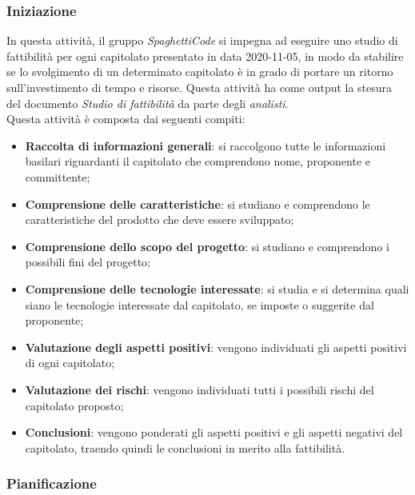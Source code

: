 \subsubsection{Iniziazione}
\label{par:iniziazione}
In questa attività, il gruppo \emph{SpaghettiCode} si impegna ad eseguire uno studio di fattibilità per ogni capitolato presentato in data
2020-11-05, in modo da stabilire se lo svolgimento di un determinato capitolato è in grado di portare un ritorno sull'investimento di tempo
e risorse. Questa attività ha come output la stesura del documento \emph{Studio di fattibilità} da parte degli \emph{analisti}.\\
Questa attività è composta dai seguenti compiti:
\begin{itemize}
    \item \textbf{Raccolta di informazioni generali}: si raccolgono tutte le informazioni basilari riguardanti il
    capitolato che comprendono nome, proponente e committente;
    \item \textbf{Comprensione delle caratteristiche}: si studiano e comprendono le caratteristiche del prodotto che
    deve essere sviluppato;
    \item \textbf{Comprensione dello scopo del progetto}: si studiano e comprendono i possibili fini del progetto;
    \item \textbf{Comprensione delle tecnologie interessate}: si studia e si determina quali siano le tecnologie
    interessate dal capitolato, se imposte o suggerite dal proponente;
    \item \textbf{Valutazione degli aspetti positivi}: vengono individuati gli aspetti positivi di ogni capitolato;
    \item \textbf{Valutazione dei rischi}: vengono individuati tutti i possibili rischi del capitolato proposto;
    \item \textbf{Conclusioni}: vengono ponderati gli aspetti positivi e gli aspetti negativi del capitolato, traendo
        quindi le conclusioni in merito alla fattibilità.
\end{itemize}

\subsubsection{Pianificazione}
\label{par:pianificazione}


